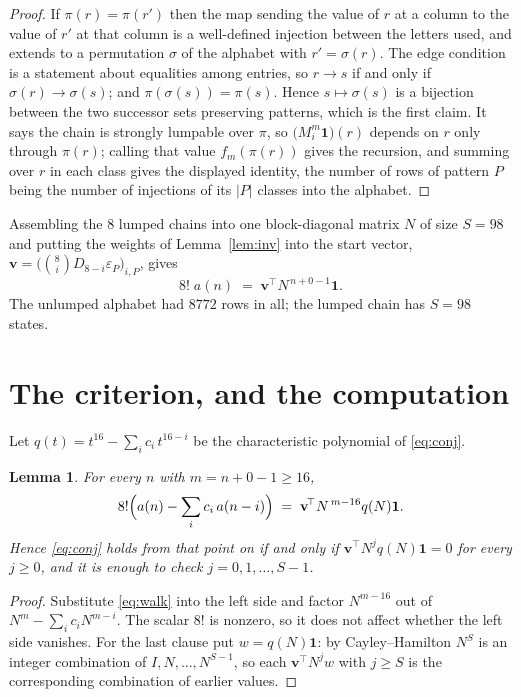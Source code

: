 \documentclass[11pt,a4paper]{article}
\theoremstyle{plain}
\newtheorem{lemma}[theorem]{Lemma}
\theoremstyle{definition}
\begin{document}
\begin{proof}
If $\pi(r)=\pi(r')$ then the map sending the value of $r$ at a column to the value of $r'$
at that column is a well-defined injection between the letters used, and extends to a
permutation $\sigma$ of the alphabet with $r'=\sigma(r)$. The edge condition is a statement
about equalities among entries, so $r\to s$ if and only if $\sigma(r)\to\sigma(s)$; and
$\pi(\sigma(s))=\pi(s)$. Hence $s\mapsto\sigma(s)$ is a bijection between the two successor
sets preserving patterns, which is the first claim. It says the chain is strongly lumpable
over $\pi$, so $\bigl(M_i^{m}\mathbf{1}\bigr)(r)$ depends on $r$ only through $\pi(r)$;
calling that value $f_m(\pi(r))$ gives the recursion, and summing over $r$ in each class
gives the displayed identity, the number of rows of pattern $P$ being the number of
injections of its $|P|$ classes into the alphabet.
\end{proof}

Assembling the $8$ lumped chains into one block-diagonal matrix $N$ of size $S=98$ and
putting the weights of Lemma~\ref{lem:inv} into the start vector,
$\mathbf{v}=\bigl(\binom{8}{i}D_{8-i}\varepsilon_P\bigr)_{i,P}$, gives
\begin{equation}\label{eq:walk}
8!\;a(n)\;=\;\mathbf{v}^{\!\top}N^{\,n+0-1}\mathbf{1} .
\end{equation}
The unlumped alphabet had $8772$ rows in all; the lumped chain has $S=98$ states.

\section{The criterion, and the computation}

Let $q(t)=t^{16}-\sum_i c_i\,t^{16-i}$ be the characteristic polynomial of
\eqref{eq:conj}.

\begin{lemma}\label{lem:crit}
For every $n$ with $m=n+0-1\ge16$,
\[
8!\Bigl(a(n)-\sum_i c_i\,a(n-i)\Bigr)\;=\;\mathbf{v}^{\!\top}N^{\,m-16}q(N)\mathbf{1} .
\]
Hence \eqref{eq:conj} holds from that point on if and only if
$\mathbf{v}^{\!\top}N^{j}q(N)\mathbf{1}=0$ for every $j\ge0$, and it is enough to check
$j=0,1,\dots,S-1$.
\end{lemma}

\begin{proof}
Substitute \eqref{eq:walk} into the left side and factor $N^{m-16}$ out of
$N^{m}-\sum_i c_iN^{m-i}$. The scalar $8!$ is nonzero, so it does not affect whether
the left side vanishes. For the last clause put $w=q(N)\mathbf{1}$: by Cayley--Hamilton
$N^{S}$ is an integer combination of $I,N,\dots,N^{S-1}$, so each
$\mathbf{v}^{\!\top}N^{j}w$ with $j\ge S$ is the corresponding combination of earlier
values.
\end{proof}
\end{document}
